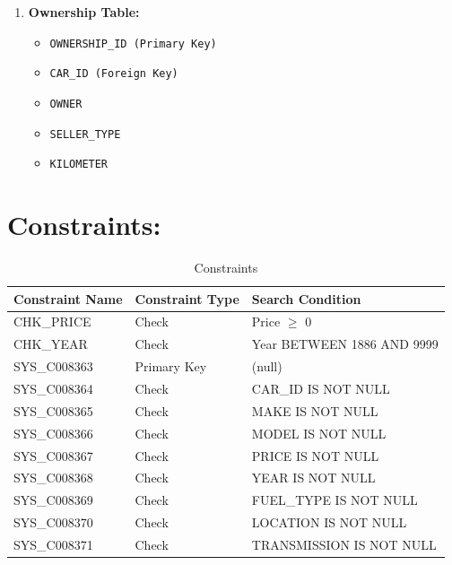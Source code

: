 \documentclass[12pt]{report}
\begin{document}
\begin{enumerate}
    \item \textbf{Ownership Table:}
    \begin{itemize}
        \item \texttt{OWNERSHIP\_ID (Primary Key)}
        \item \texttt{CAR\_ID (Foreign Key)}
        \item \texttt{OWNER}
        \item \texttt{SELLER\_TYPE}
        \item \texttt{KILOMETER}
    \end{itemize}
\end{enumerate}
\section{Constraints:}
\begin{table}[h]  
    \centering  
    \caption{Constraints}
    \begin{tabular}{|l|l|l|}  
        \hline  
        \textbf{Constraint Name} & \textbf{Constraint Type} & \textbf{Search Condition} \\ \hline  
        CHK\_PRICE                & Check                    & Price $\geq$ 0                \\ \hline  
        CHK\_YEAR                 & Check                    & Year BETWEEN 1886 AND 9999\\ \hline  
        SYS\_C008363              & Primary Key              & (null)                    \\ \hline  
        SYS\_C008364              & Check                    & CAR\_ID IS NOT NULL      \\ \hline  
        SYS\_C008365              & Check                    & MAKE IS NOT NULL        \\ \hline  
        SYS\_C008366              & Check                    & MODEL IS NOT NULL       \\ \hline  
        SYS\_C008367              & Check                    & PRICE IS NOT NULL       \\ \hline  
        SYS\_C008368              & Check                    & YEAR IS NOT NULL        \\ \hline  
        SYS\_C008369              & Check                    & FUEL\_TYPE IS NOT NULL   \\ \hline  
        SYS\_C008370              & Check                    & LOCATION IS NOT NULL    \\ \hline  
        SYS\_C008371              & Check                    & TRANSMISSION IS NOT NULL \\ \hline  
    \end{tabular}  
\end{table}
\end{document}
